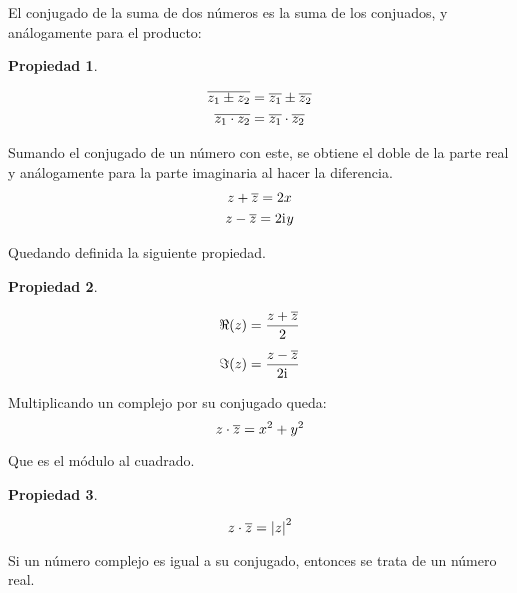 \documentclass[a5paper,12pt,twoside]{book}
\newtheorem{prop}{{Propiedad}}[chapter]
\begin{document}
El conjugado de la suma de dos números es la suma de los conjuados, y análogamente para el producto:

\begin{mdframed}[style=MyFrame1]
    \begin{prop}
        \label{prop:zw*=(z*w)*}
    \end{prop}
    \begin{gather*}
        \overline{z_1 \pm z_2} = \overline{z_1} \pm \overline{z_2}
        \\
        \overline{z_1 \cdot z_2} = \overline{z_1} \cdot \overline{z_2}
    \end{gather*}
\end{mdframed}

Sumando el conjugado de un número con este, se obtiene el doble de la parte real y análogamente para la parte imaginaria al hacer la diferencia.
\begin{gather*}
        z+\overline{z} = 2x
        \\
        z-\overline{z} = 2 \mathrm{i}\mkern1mu y
    \end{gather*}

Quedando definida la siguiente propiedad.

\begin{mdframed}[style=MyFrame1]
    \begin{prop}
        \label{prop:ReIm}
    \end{prop}
    \begin{align*}
        \Re (z) &= \frac{z+\overline{z}}{2}
        \\[1ex]
        \Im (z) &= \frac{z-\overline{z}}{2 \mathrm{i}\mkern1mu}
    \end{align*}
\end{mdframed}

Multiplicando un complejo por su conjugado queda:
\begin{equation*}
    z \cdot \overline{z} = x^2+y^2
\end{equation*}

Que es el módulo al cuadrado.

\begin{mdframed}[style=MyFrame1]
    \begin{prop}
        \label{prop:|z|^2=z.z*}
    \end{prop}
    \begin{equation*}
        z \cdot \overline{z} = {\left| {z} \right|}^2
    \end{equation*}
\end{mdframed}

Si un número complejo es igual a su conjugado, entonces se trata de un número real.
\end{document}
